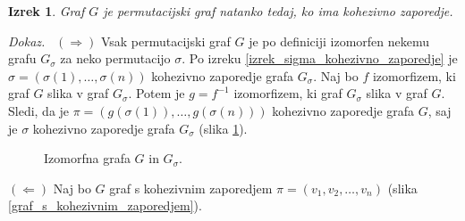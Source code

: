 \documentclass[a4paper, 12pt]{book}
\newtheorem{izrek}{Izrek}[chapter]
\newenvironment{dokaz}{\emph{Dokaz.}\ }{\hspace{\fill}{$\Box$}}
\begin{document}
\begin{izrek}
\label{izrek_permutacijski_graf_kohezivno_zaporedje}
    Graf $G$ je permutacijski graf natanko tedaj, ko ima kohezivno zaporedje.
\end{izrek}
\begin{dokaz}
    $(\Rightarrow)$ Vsak permutacijski graf $G$ je po definiciji izomorfen nekemu grafu $G_{\sigma}$ za neko permutacijo $\sigma$. Po izreku \ref{izrek_sigma_kohezivno_zaporedje} je $\sigma = (\sigma(1), \dots, \sigma(n))$ kohezivno zaporedje grafa $G_{\sigma}$. Naj bo $f$ izomorfizem, ki graf $G$ slika v graf $G_{\sigma}$. Potem je $g = f^{-1}$ izomorfizem, ki graf $G_{\sigma}$ slika v graf $G$. Sledi, da je $\pi = (g(\sigma(1)), \dots, g(\sigma(n)))$ kohezivno zaporedje grafa $G$, saj je $\sigma$ kohezivno zaporedje grafa $G_{\sigma}$ (slika \ref{graf_izomorfizem_f_k3}).

    \begin{figure}[h]
        \begin{center}        
        \end{center}
        \caption{Izomorfna grafa $G$ in $G_{\sigma}$.}
        \label{graf_izomorfizem_f_k3}
    \end{figure}

    $(\Leftarrow)$ Naj bo $G$ graf s kohezivnim zaporedjem $\pi = (v_1, v_2, \dots, v_n)$ (slika \ref{graf_s_kohezivnim_zaporedjem}). 
    \begin{figure}[h]
        \begin{center}
\end{center}
\end{figure}
\end{dokaz}
\end{document}
